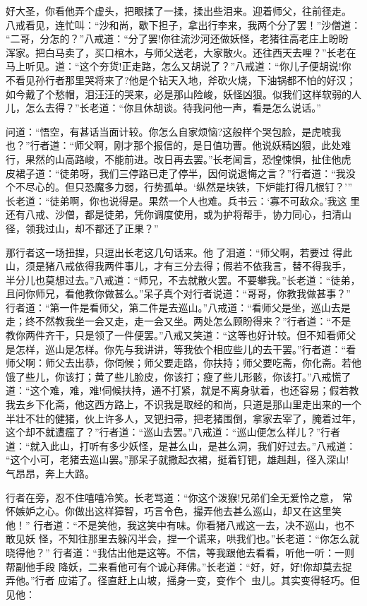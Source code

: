 好大圣，你看他弄个虚头，把眼揉了一揉，揉出些泪来。迎着师父，往前径走。
八戒看见，连忙叫：“沙和尚，歇下担子，拿出行李来，我两个分了罢！”沙僧道：
“二哥，分怎的？”八戒道：“分了罢!你往流沙河还做妖怪，老猪往高老庄上盼盼
浑家。把白马卖了，买口棺木，与师父送老，大家散火。还往西天去哩？”长老在
马上听见。道：“这个夯货!正走路，怎么又胡说了？”八戒道：“你儿子便胡说!你
不看见孙行者那里哭将来了?他是个钻天入地，斧砍火烧，下油锅都不怕的好汉；
如今戴了个愁帽，泪汪汪的哭来，必是那山险峻，妖怪凶狠。似我们这样软弱的人
儿，怎么去得？”长老道：“你且休胡谈。待我问他一声，看是怎么说话。”

问道：“悟空，有甚话当面计较。你怎么自家烦恼?这般样个哭包脸，是虎唬我
也？”行者道：“师父啊，刚才那个报信的，是日值功曹。他说妖精凶狠，此处难
行，果然的山高路峻，不能前进。改日再去罢。”长老闻言，恐惶悚惧，扯住他虎
皮裙子道：“徒弟呀，我们三停路已走了停半，因何说退悔之言？”行者道：“我没
个不尽心的。但只恐魔多力弱，行势孤单。‘纵然是块铁，下炉能打得几根钉？’”
长老道：“徒弟啊，你也说得是。果然一个人也难。兵书云：‘寡不可敌众。’我这
里还有八戒、沙僧，都是徒弟，凭你调度使用，或为护将帮手，协力同心，扫清山
径，领我过山，却不都还了正果？”

那行者这一场扭捏，只逗出长老这几句话来。他了泪道：“师父啊，若要过
得此山，须是猪八戒依得我两件事儿，才有三分去得；假若不依我言，替不得我手，
半分儿也莫想过去。”八戒道：“师兄，不去就散火罢。不要攀我。”长老道：“徒弟，
且问你师兄，看他教你做甚么。”呆子真个对行者说道：“哥哥，你教我做甚事？”
行者道：“第一件是看师父，第二件是去巡山。”八戒道：“看师父是坐，巡山去是
走；终不然教我坐一会又走，走一会又坐。两处怎么顾盼得来？”行者道：“不是
教你两件齐干，只是领了一件便罢。”八戒又笑道：“这等也好计较。但不知看师父
是怎样，巡山是怎样。你先与我讲讲，等我依个相应些儿的去干罢。”行者道：“看
师父啊：师父去出恭，你伺候；师父要走路，你扶持；师父要吃斋，你化斋。若他
饿了些儿，你该打；黄了些儿脸皮，你该打；瘦了些儿形骸，你该打。”八戒慌了
道：“这个难，难，难!伺候扶持，通不打紧，就是不离身驮着，也还容易；假若教
我去乡下化斋，他这西方路上，不识我是取经的和尚，只道是那山里走出来的一个
半壮不壮的健猪，伙上许多人，叉钯扫帚，把老猪围倒，拿家去宰了，腌着过年，
这个却不就遭瘟了？”行者道：“巡山去罢。”八戒道：“巡山便怎么样儿？”行者
道：“就入此山，打听有多少妖怪，是甚么山，是甚么洞，我们好过去。”八戒道：
“这个小可，老猪去巡山罢。”那呆子就撒起衣裙，挺着钉钯，雄赳赳，径入深山!
气昂昂，奔上大路。

行者在旁，忍不住嘻嘻冷笑。长老骂道：“你这个泼猴!兄弟们全无爱怜之意，
常怀嫉妒之心。你做出这样獐智，巧言令色，撮弄他去甚么巡山，却又在这里笑他！”
行者道：“不是笑他，我这笑中有味。你看猪八戒这一去，决不巡山，也不敢见妖
怪，不知往那里去躲闪半会，捏一个谎来，哄我们也。”长老道：“你怎么就晓得他？”
行者道：“我估出他是这等。不信，等我跟他去看看，听他一听：一则帮副他手段
降妖，二来看他可有个诚心拜佛。”长老道：“好，好，好!你却莫去捉弄他。”行者
应诺了。径直赶上山坡，摇身一变，变作个虫儿。其实变得轻巧。但见他：

